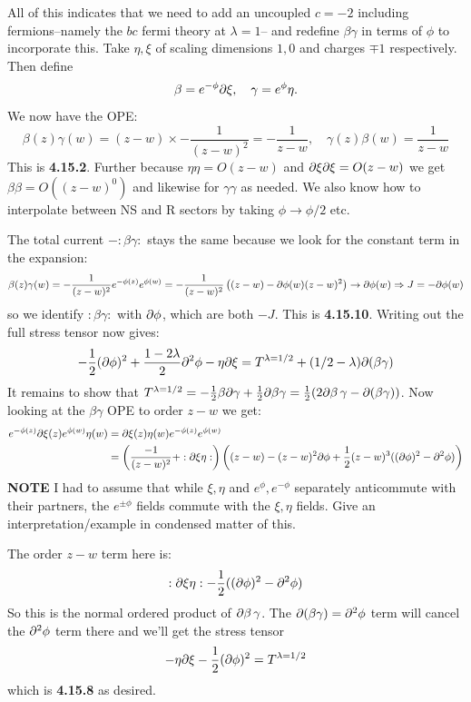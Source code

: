 \documentclass[11pt]{article}
\begin{document}
\begin{enumerate}
	All of this indicates that we need to add an uncoupled $c = -2$ including fermions--namely the $bc$ fermi theory at $\lambda = 1$--  and redefine $\beta \gamma$ in terms of $\phi$ to incorporate this. Take $\eta, \xi$ of scaling dimensions $1, 0$ and charges $\mp 1$ respectively. Then define
	\[
		\beta = e^{- \phi} \partial \xi, \quad \gamma = e^{\phi} \eta.
	\]
	We now have the OPE:
	\[
		\beta(z) \gamma(w) = (z-w) \times - \frac{1}{(z-w)^2} = -\frac{1}{z-w}, \quad \gamma(z) \beta(w) = \frac{1}{z-w}
	\]
	This is \textbf{4.15.2}. Further because $\eta \eta = O(z-w)$ and  $\partial \xi \partial \xi = O(z - w)$ we get $\beta \beta = O((z-w)^0)$ and likewise for $\gamma \gamma$ as needed. We also know how to interpolate between NS and R sectors by taking $\phi \to \phi/2$ etc. 
	
	The total current $-:\beta \gamma:$ stays the same because we look for the constant term in the expansion:
	\[
		\beta(z) \gamma(w) = -\frac{1}{(z-w)^2} e^{-\phi(z)} e^{\phi(w)} = -\frac{1}{(z-w)^2} \left((z-w) - \partial \phi(w) (z-w)^2 \right) \to \partial \phi(w) \Rightarrow J = - \partial \phi(w)
	\]
	so we identify $:\beta \gamma:$ with $\partial \phi$, which are both $-J$. This is \textbf{4.15.10}. Writing out the full stress tensor now gives:
	\[
		-\frac12 (\partial \phi)^2 + \frac{1 - 2\lambda}{2} \partial^2 \phi - \eta \partial \xi = T^{\lambda = 1/2} + (1/2 - \lambda) \partial(\beta \gamma)
	\]
	It remains to show that $T^{\lambda = 1/2} = -\frac12 \beta \partial \gamma + \frac12 \partial \beta \gamma = \frac12 (2 \partial \beta \, \gamma - \partial (\beta \gamma))$. Now looking at the $\beta \gamma$ OPE to order $z-w$ we get:
	\[
	\begin{aligned}
		e^{- \phi(z)} \partial \xi(z) e^{\phi(w)} \eta(w) &= \partial \xi(z) \eta(w) e^{- \phi(z)} e^{\phi(w)} \\ &=  \left(\frac{-1}{(z-w)^2} + :\partial \xi \eta: \right) \left( (z-w) -  (z-w)^2 \partial \phi + \frac12 (z-w)^3 ((\partial \phi)^2 - \partial^2 \phi) \right)
	\end{aligned}
	\]
	\textbf{NOTE} I had to assume that while $\xi, \eta$ and $e^{\phi}, e^{-\phi}$ separately anticommute with their partners, the $e^{\pm \phi}$ fields commute with the $\xi, \eta$ fields. Give an interpretation/example in condensed matter of this. 
	
	The order $z-w$ term here is:
	\[
		:\partial \xi \eta: - \frac12 ((\partial \phi)^2 - \partial^2 \phi)
	\]
	So this is the normal ordered product of $\partial \beta\, \gamma$. The $\partial (\beta \gamma) = \partial^2 \phi$ term will cancel the $\partial^2 \phi$ term there and we'll get the stress tensor 
	\[
		- \eta \partial \xi  - \frac12 (\partial \phi)^2 = T^{\lambda = 1/2}
	\]
	which is \textbf{4.15.8} as desired.
	

\end{enumerate}
\end{document}
